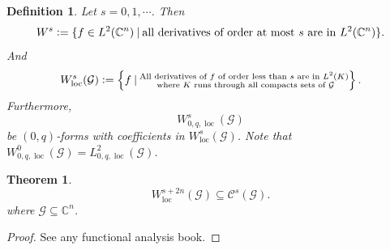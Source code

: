 \documentclass{article}
\newtheorem{theorem}{Theorem} [section]
\newtheorem{definition}{Definition}[section]
\DeclareMathOperator{\loc}{loc}
\newcommand{\defeq}{\vcentcolon=}
\newcommand{\C}[0]{\mathbb{C}}
\newcommand{\G}[0]{\mathcal{G}}
\newcommand{\sep}[0]{\:|\:}
\begin{document}
\begin{definition}
Let $s=0,1,\cdots$. Then 
\begin{equation*}
  W^s \defeq \{f\in L^2(\C^n)\sep\text{all derivatives of order at most $s$ are in $L^2(\C^n)$}\}.
\end{equation*}
And 
\begin{equation*}
  W^s_{\loc}(\G)\defeq \left\{f\sep\substack{\text{All derivatives of $f$ of order less than $s$ are in $L^2(K)$}\\\text{ where $K$ runs through all compacts sets of $\G$}}\right\}.
\end{equation*}
Furthermore,
\begin{equation*}
  W^s_{0,q,\loc}(\G)
\end{equation*}
be $(0,q)$-forms with coefficients in $W^s_{\loc}(\G)$. Note that $W_{0,q,\loc}^0(\G)=L_{0,q,\loc}^2(\G)$.
\end{definition}
\begin{theorem}
  \begin{equation*}
    W^{s+2n}_{\loc}(\G)\subseteq \mathcal{C}^s(\G).
  \end{equation*}
  where $\G\subseteq\C^n$.
\end{theorem}
\begin{proof}
  See any functional analysis book.
\end{proof}
\end{document}
